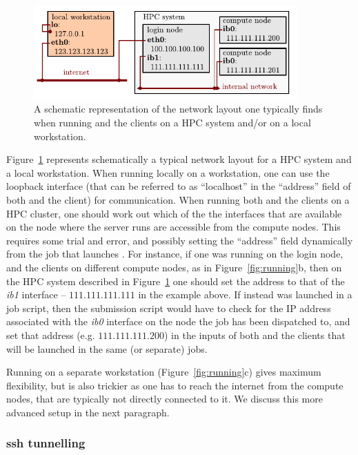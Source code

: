 \documentclass[11pt,english,fleqn]{report}
\begin{document}
\begin{figure}[hbt]
\centering\includegraphics[width=0.9\textwidth]{figures/ipi-network.pdf}
\caption{\label{fig:network} A schematic representation of the network layout one 
typically finds when running \ipi and the clients on a HPC system and/or on a local workstation. } 
\end{figure}

Figure~\ref{fig:network} represents schematically a typical network layout
for a HPC system and a local workstation. When running \ipi locally on a 
workstation, one can use the loopback interface (that can be referred to as 
``localhost'' in the ``address'' field of both \ipi and the client) for communication.
When running both \ipi and the clients on a HPC cluster, one should work out which of the
the interfaces that are available on the node where the \ipi server runs are accessible from the
compute nodes. This requires some trial and error, and possibly setting the 
 ``address'' field dynamically from the job that launches \ipi. 
 For instance,
if one was running \ipi on the login node, and the clients on different compute nodes, as 
in Figure~\ref{fig:running}b, then on the HPC system described in Figure~\ref{fig:network} 
one should set the address to that of the \emph{ib1} interface -- $111.111.111.111$ in 
the example above. If instead \ipi was launched in a job script, then the submission script would
have to check for the IP address associated with the \emph{ib0} interface on the node
the job has been dispatched to, and set that address (e.g. $111.111.111.200$) in the inputs
of both \ipi and the clients that will be launched in the same (or separate) jobs.

Running \ipi on a separate workstation (Figure~\ref{fig:running}c) gives 
maximum flexibility, but is also trickier as one has to reach the 
internet from the compute nodes, that are typically not directly connected to it. 
We discuss this more advanced setup in the next paragraph.

\subsubsection{ssh tunnelling}
\end{document}
